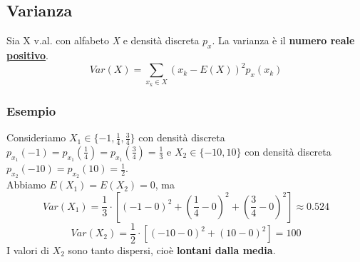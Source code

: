 \documentclass{report}
\begin{document}
\subsection{Varianza}
Sia X v.al. con alfabeto \textit{X} e densità discreta \(p_x\). La varianza è il \textbf{numero reale \underline{positivo}}.
\[Var(X) = \sum_{x_{k} \in \textit{X}}(x_k - E(X))^{2} p_x(x_k)\]
\subsubsection{Esempio}
Consideriamo \(X_1 \in \{-1, \frac{1}{4}, \frac{3}{4}\}\) con densità discreta \(p_{x_1} (-1) = p_{x_1} (\frac{1}{4}) = p_{x_1} (\frac{3}{4}) = \frac{1}{3}\) e \(X_2 \in \{-10,10\}\) con densità discreta \(p_{x_2}(-10) = p_{x_2}(10) = \frac{1}{2}\).\\
Abbiamo \(E(X_1) = E(X_2) = 0\), ma
\[Var(X_1) = \frac{1}{3}\cdot[(-1-0)^2 + (\frac{1}{4} - 0)^2 + (\frac{3}{4} - 0)^2] \approx 0.524\]
\[Var(X_2) = \frac{1}{2}\cdot[(-10-0)^2 + (10 - 0)^2] = 100\]
I valori di \(X_2\) sono tanto dispersi, cioè \textbf{lontani dalla media}.
\end{document}
